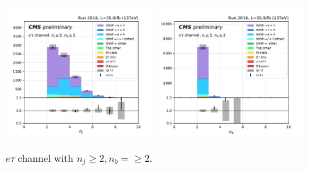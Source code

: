 \begin{figure}[ht]
    \includegraphics[width=0.49\textwidth]{chapters/Analysis/sectionPlots/figures/kinematics_pickles/etau/2b/etau_2b_nJets.pdf}
    \includegraphics[width=0.49\textwidth]{chapters/Analysis/sectionPlots/figures/kinematics_pickles/etau/2b/etau_2b_nBJets.pdf}
    
    \caption{$e\tau$ channel with $n_j\geq2, n_b=\geq2$.}
\end{figure}



